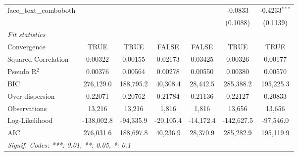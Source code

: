 \begin{table}[htbp]
\begin{tabular}{lcccccc}
      face\_text\_comboboth          &                                &                               &                        &                      & -0.0833                        & -0.4233$^{***}$\\   
                                     &                                &                               &                        &                      & (0.1088)                       & (0.1139)\\   
      \midrule
      \emph{Fit statistics}\\
      Convergence                    &TRUE                            & TRUE                          & FALSE                  & FALSE                & TRUE                           & TRUE\\  
      Squared Correlation            & 0.00322                        & 0.00155                       & 0.02173                & 0.03425              & 0.00326                        & 0.00177\\  
      Pseudo R$^2$                   & 0.00376                        & 0.00564                       & 0.00278                & 0.00550              & 0.00380                        & 0.00570\\  
      BIC                            & 276,129.0                      & 188,795.2                     & 40,308.4               & 28,442.5             & 285,388.2                      & 195,225.3\\  
      Over-dispersion                & 0.22071                        & 0.20762                       & 0.21784                & 0.21136              & 0.22127                        & 0.20833\\  
      Observations                   & 13,216                         & 13,216                        & 1,816                  & 1,816                & 13,656                         & 13,656\\  
      Log-Likelihood                 & -138,002.8                     & -94,335.9                     & -20,105.4              & -14,172.4            & -142,627.5                     & -97,546.0\\  
      AIC                            & 276,031.6                      & 188,697.8                     & 40,236.9               & 28,370.9             & 285,282.9                      & 195,119.9\\  
      \midrule \midrule
      \multicolumn{7}{l}{\emph{Signif. Codes: ***: 0.01, **: 0.05, *: 0.1}}\\
   \end{tabular}
\end{table}


